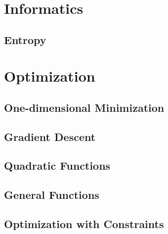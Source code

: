 \section{Informatics}
\label{section2.4}

\subsection{Entropy}

\section{Optimization}
\label{section2.5}

\subsection{One-dimensional Minimization}

\subsection{Gradient Descent}

\subsection{Quadratic Functions}

\subsection{General Functions}

\subsection{Optimization with Constraints}